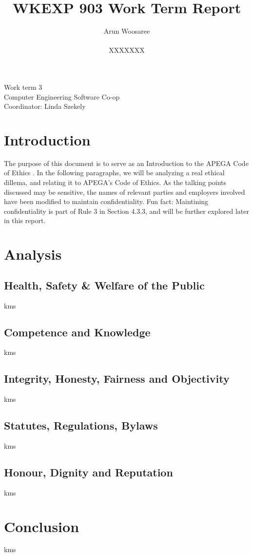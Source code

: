 \documentclass[letterpaper,12pt]{article}
\title{WKEXP 903 Work Term Report}
\author{Arun Woosaree \\ \\ XXXXXXX}
\begin{document}
\relax
\begin{titlepage}
 \maketitle
 \thispagestyle{empty} %
 \centering
 \large
 \vspace{1cm}
 Work term 3\\
 \vspace{1cm}
 Computer Engineering Software Co-op \\
 \vspace{1cm}
 Coordinator: Linda Szekely
\end{titlepage}

\section{Introduction}
The purpose of this document is to serve as an Introduction to the APEGA Code of Ethics \cite{apegacode}. 
In the following paragraphs, we will be analyzing a real ethical dillema, and relating it to APEGA's Code of Ethics.
As the talking points discussed may be sensitive, the names of relevant parties and employers involved have been modified to maintain confidentiality.
Fun fact: Maintining confidentiality is part of Rule 3 in Section 4.3.3, and will be further explored later in this report.


\section{Analysis}

\subsection{Health, Safety \& Welfare of the Public}
kms

\subsection{Competence and Knowledge}
kms

\subsection{Integrity, Honesty, Fairness and Objectivity}
kms

\subsection{Statutes, Regulations, Bylaws}
kms

\subsection{Honour, Dignity and Reputation}
kms

\section{Conclusion}
kms


\singlespacing
\nocite{*}
\printbibliography
\end{document}

